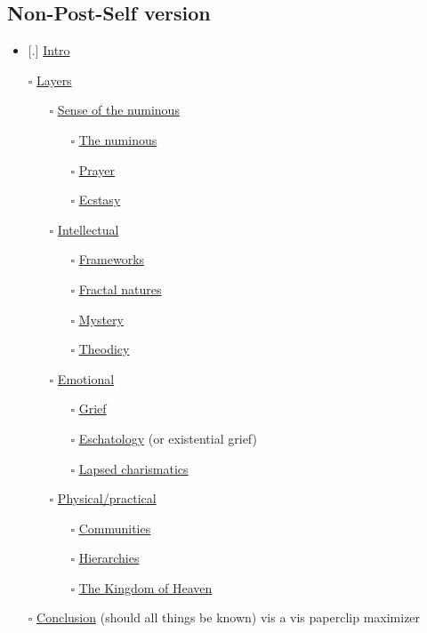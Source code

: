 \hypertarget{non-post-self-version}{%
\subsection{Non-Post-Self version}\label{non-post-self-version}}

\begin{itemize}
\tightlist
\item
  {[}.{]} \href{mfa/intro}{Intro}
\item[$\square$]
  \href{mfa/layers}{Layers}

  \begin{itemize}
  \tightlist
  \item[$\square$]
    \href{mfa/section-numinous}{Sense of the numinous}

    \begin{itemize}
    \tightlist
    \item[$\square$]
      \href{mfa/numinous}{The numinous}
    \item[$\square$]
      \href{mfa/prayer}{Prayer}
    \item[$\square$]
      \href{mfa/ecstasy}{Ecstasy}
    \end{itemize}
  \item[$\square$]
    \href{mfa/section-intellectual}{Intellectual}

    \begin{itemize}
    \tightlist
    \item[$\square$]
      \href{mfa/frameworks}{Frameworks}
    \item[$\square$]
      \href{mfa/fractal}{Fractal natures}
    \item[$\square$]
      \href{mfa/mystery}{Mystery}
    \item[$\square$]
      \href{mfa/theodicy}{Theodicy}
    \end{itemize}
  \item[$\square$]
    \href{mfa/section-emotional}{Emotional}

    \begin{itemize}
    \tightlist
    \item[$\square$]
      \href{mfa/grief}{Grief}
    \item[$\square$]
      \href{mfa/eschatology}{Eschatology} (or existential grief)
    \item[$\square$]
      \href{mfa/charismatics}{Lapsed charismatics}
    \end{itemize}
  \item[$\square$]
    \href{mfa/section-practical}{Physical/practical}

    \begin{itemize}
    \tightlist
    \item[$\square$]
      \href{mfa/communities}{Communities}
    \item[$\square$]
      \href{mfa/hierarchies}{Hierarchies}
    \item[$\square$]
      \href{mfa/kingdom}{The Kingdom of Heaven}
    \end{itemize}
  \end{itemize}
\item[$\square$]
  \href{mfa/conclusion}{Conclusion} (should all things be known) vis a vis paperclip maximizer
\end{itemize}
